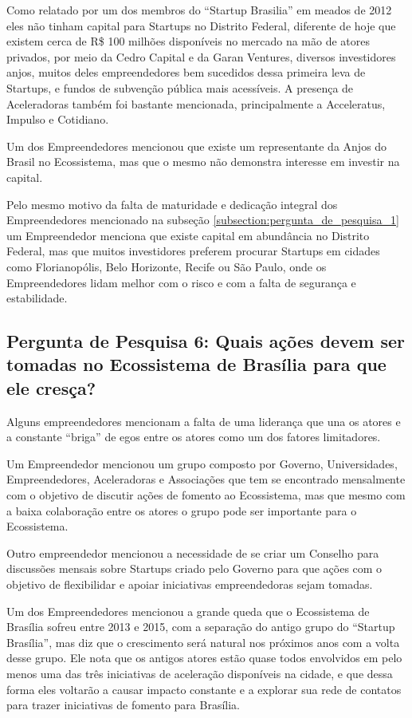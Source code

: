Como relatado por um dos membros do ``Startup Brasilia'' em meados de 2012 eles não tinham capital para Startups no Distrito Federal, diferente de hoje que existem cerca de R\$ 100 milhões disponíveis no mercado na mão de atores privados, por meio da Cedro Capital e da Garan Ventures, diversos investidores anjos, muitos deles empreendedores bem sucedidos dessa primeira leva de Startups, e fundos de subvenção pública mais acessíveis. A presença de Aceleradoras também foi bastante mencionada, principalmente a Acceleratus, Impulso e Cotidiano. 

Um dos Empreendedores mencionou que existe um representante da Anjos do Brasil no Ecossistema, mas que o mesmo não demonstra interesse em investir na capital.

Pelo mesmo motivo da falta de maturidade e dedicação integral dos Empreendedores mencionado na subseção \ref{subsection:pergunta_de_pesquisa_1} um Empreendedor menciona que existe capital em abundância no Distrito Federal, mas que muitos investidores preferem procurar Startups em cidades como Florianopólis, Belo Horizonte, Recife ou São Paulo, onde os Empreendedores lidam melhor com o risco e com a falta de segurança e estabilidade.

\subsection{Pergunta de Pesquisa 6: Quais ações devem ser tomadas no Ecossistema de Brasília para que ele cresça?}
\label{subsection:pergunta_de_pesquisa_6}

Alguns empreendedores mencionam a falta de uma liderança que una os atores e a constante ``briga'' de egos entre os atores como um dos fatores limitadores.

Um Empreendedor mencionou um grupo composto por Governo, Universidades, Empreendedores, Aceleradoras e Associações que tem se encontrado mensalmente com o objetivo de discutir ações de fomento ao Ecossistema, mas que mesmo com a baixa colaboração entre os atores o grupo pode ser importante para o Ecossistema. 

Outro empreendedor mencionou a necessidade de se criar um Conselho para discussões mensais sobre Startups criado pelo Governo para que ações com o objetivo de flexibilidar e apoiar iniciativas empreendedoras sejam tomadas.

Um dos Empreendedores mencionou a grande queda que o Ecossistema de Brasília sofreu entre 2013 e 2015, com a separação do antigo grupo do ``Startup Brasília'', mas diz que o crescimento será natural nos próximos anos com a volta desse grupo. Ele nota que os antigos atores estão quase todos envolvidos em pelo menos uma das três iniciativas de aceleração disponíveis na cidade, e que dessa forma eles voltarão a causar impacto constante e a explorar sua rede de contatos para trazer iniciativas de fomento para Brasília.

